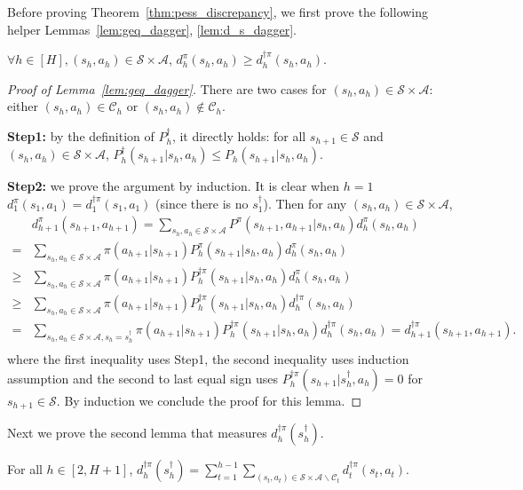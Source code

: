 Before proving Theorem~\ref{thm:pess_discrepancy}, we first prove the following helper Lemmas~\ref{lem:geq_dagger}, \ref{lem:d_s_dagger}.
\begin{lemma}\label{lem:geq_dagger}
	$\forall h\in[H], (s_h,a_h)\in\mathcal{S}\times\mathcal{A}$, $d^\pi_h(s_h,a_h)\geq d^{\dagger\pi}_h(s_h,a_h)$.
\end{lemma}
\begin{proof}[Proof of Lemma~\ref{lem:geq_dagger}]
	There are two cases for $(s_h,a_h)\in\mathcal{S}\times\mathcal{A}$: either $(s_h,a_h)\in\mathcal{C}_h$ or $(s_h,a_h)\notin\mathcal{C}_h$.
	
	\textbf{Step1:} by the definition of $P^\dagger_h$, it directly holds: for all $s_{h+1}\in\mathcal{S}$ and $(s_h,a_h)\in\mathcal{S}\times\mathcal{A}$, $P^\dagger_h(s_{h+1}|s_h,a_h)\leq P_h(s_{h+1}|s_h,a_h)$.
	
	\textbf{Step2:} we prove the argument by induction. It is clear when $h=1$ $d^\pi_1(s_1,a_1)= d^{\dagger\pi}_1(s_1,a_1)$ (since there is no $s^\dagger_1$). Then for any $(s_h,a_h)\in\mathcal{S}\times\mathcal{A}$,
	\begin{align*}
	&d^\pi_{h+1}(s_{h+1},a_{h+1})=\sum_{s_h,a_h\in\mathcal{S}\times\mathcal{A}}P^\pi(s_{h+1},a_{h+1}|s_{h},a_{h})d^\pi_{h}(s_{h},a_{h})\\
	=&\sum_{s_h,a_h\in\mathcal{S}\times\mathcal{A}}\pi(a_{h+1}|s_{h+1})P^\pi_h(s_{h+1}|s_{h},a_{h})d^\pi_{h}(s_{h},a_{h})\\
	\geq &\sum_{s_h,a_h\in\mathcal{S}\times\mathcal{A}}\pi(a_{h+1}|s_{h+1})P^{\dagger\pi}_h(s_{h+1}|s_{h},a_{h})d^\pi_{h}(s_{h},a_{h})\\
	\geq &\sum_{s_h,a_h\in\mathcal{S}\times\mathcal{A}}\pi(a_{h+1}|s_{h+1})P^{\dagger\pi}_h(s_{h+1}|s_{h},a_{h})d^{\dagger\pi}_{h}(s_{h},a_{h})\\
	= &\sum_{s_h,a_h\in\mathcal{S}\times\mathcal{A},s_{h}=s_h^\dagger}\pi(a_{h+1}|s_{h+1})P^{\dagger\pi}_h(s_{h+1}|s_{h},a_{h})d^{\dagger\pi}_{h}(s_{h},a_{h})=d^{\dagger\pi}_{h+1}(s_{h+1},a_{h+1}).\\
	\end{align*}
	where the first inequality uses Step1, the second inequality uses induction assumption and the second to last equal sign uses $P^{\dagger\pi}_h(s_{h+1}|s_{h}^\dagger,a_{h})=0$ for $s_{h+1}\in\mathcal{S}$. By induction we conclude the proof for this lemma. 
	
\end{proof}
Next we prove the second lemma that measures $d^{\dagger\pi}_h(s^\dagger_h)$. 
\begin{lemma}\label{lem:d_s_dagger}
	For all $h\in[2,H+1]$, $d^{\dagger\pi}_h(s^\dagger_h)=\sum_{t=1}^{h-1}\sum_{(s_t,a_t)\in\mathcal{S}\times\mathcal{A}\backslash\mathcal{C}_t}d^{\dagger\pi}_t(s_t,a_t)$.
\end{lemma}
